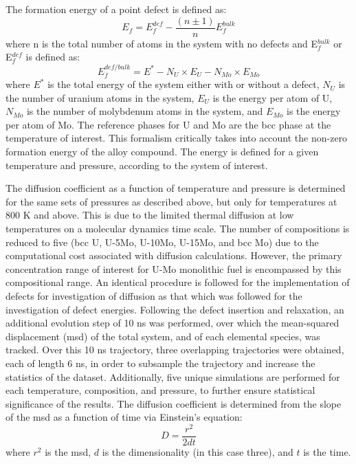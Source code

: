 \documentclass[11pt, oneside]{elsarticle}
\begin{document}
The formation energy of a point defect is defined as:
\begin{equation}
 E_f= E_f^{def} -  \frac{(n\pm1)}{n}E_f^{bulk}
\end{equation}
\noindent where n is the total number of atoms in the system with no defects and E$_f^{bulk}$ or E$_f^{def}$ is defined as:
\begin{equation}
E_f^{def/bulk}= E^*- N_U \times E_U - N_{Mo} \times E_{Mo} 
\end{equation}
\noindent where $E^*$ is the total energy of the system either with or without a defect, $N_U$ is the number of uranium atoms in the system, $E_U$ is the energy per atom of U, $N_{Mo}$ is the number of molybdenum atoms in the system, and $E_{Mo}$ is the energy per atom of Mo. The reference phases for U and Mo are the bcc phase at the temperature of interest. This formalism critically takes into account the non-zero formation energy of the alloy compound. The energy is defined for a given temperature and pressure, according to the system of interest. 

The diffusion coefficient as a function of temperature and pressure is determined for the same sets of pressures as described above, but only for temperatures at 800 K and above. This is due to the limited thermal diffusion at low temperatures on a molecular dynamics time scale. The number of compositions is reduced to five (bcc U, U-5Mo, U-10Mo, U-15Mo, and bcc Mo) due to the computational cost associated with diffusion calculations. However, the primary concentration range of interest for U-Mo monolithic fuel is encompassed by this compositional range. An identical procedure is followed for the implementation of defects for investigation of diffusion as that which was followed for the investigation of defect energies. Following the defect insertion and relaxation, an additional evolution step of 10 ns was performed, over which the mean-squared displacement (msd) of the total system, and of each elemental species, was tracked. Over this 10 ns trajectory, three overlapping trajectories were obtained, each of length 6 ns, in order to subsample the trajectory and increase the statistics of the dataset. Additionally, five unique simulations are performed for each temperature, composition, and pressure, to further ensure statistical significance of the results. The diffusion coefficient is determined from the slope of the msd as a function of time via Einstein's equation:
\begin{equation}
D = \frac{r^2}{2dt} 
\end{equation}
\noindent where $r^2$ is the msd, $d$ is the dimensionality (in this case three), and $t$ is the time. 
\end{document}
